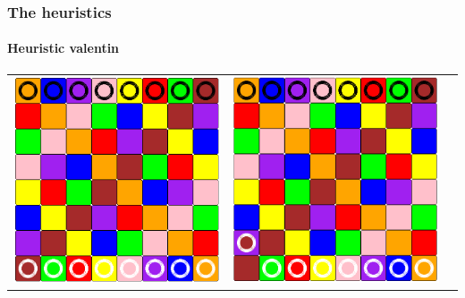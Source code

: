 \documentclass[a4paper, 11pt]{beamer}
\begin{document}
\begin{frame}
\frametitle{The heuristics}
\framesubtitle{Heuristic valentin}
\begin{center}

	\begin{tabular}{c c c}
     \includegraphics[scale = 0.12]{val_1.png} &
     \pause
     \includegraphics[scale = 0.12]{val_2.png} &

\end{tabular}
\end{center}
\end{frame}
\end{document}
